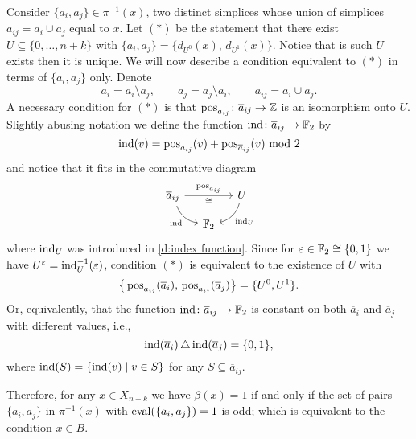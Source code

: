 Consider $\{a_i, a_j\} \in \pi^{-1}(x)$, two distinct simplices whose union of simplices $a_{ij} = a_i \cup a_j$ equal to $x$.
Let $(\ast)$ be the statement that there exist $U \subseteq \{0, \dots, n+k\}$ with $\{a_i, a_j\} = \{d_{U^0}(x),\, d_{U^1}(x)\}$.
Notice that is such $U$ exists then it is unique.
We will now describe a condition equivalent to $(\ast)$ in terms of $\{a_i, a_j\}$ only.
Denote
\begin{equation*}
\overline{a}_{i} = a_i \setminus a_j, \qquad
\overline{a}_{j} = a_j \setminus a_i, \qquad
\overline{a}_{ij} = \overline{a}_i \cup \overline{a}_j.
\end{equation*}
A necessary condition for $(\ast)$ is that $\operatorname{pos}_{a_{ij}} \colon \overline{a}_{ij} \to \mathbb{Z}$ is an isomorphism onto $U$.
Slightly abusing notation we define the function $\mathrm{ind} \colon \overline{a}_{ij} \to {\mathbb{F}_2}$ by
\begin{equation*}
\mathrm{ind}(v) = \operatorname{pos}_{a_{ij}}(v) + \operatorname{pos}_{\overline{a}_{ij}}(v) \text{ mod }2
\end{equation*}
and notice that it fits in the commutative diagram
\[
\begin{tikzcd}[column sep=small, row sep=small]
\overline{a}_{ij} \arrow[rr, "\pos_{a_{ij}}", "\cong"'] \arrow[dr, "\ind"', bend right] & &
U \arrow[dl, "\ind_U", bend left] \\
& \Ftwo &
\end{tikzcd}
\]
where $\mathrm{ind}_U$ was introduced in \cref{d:index function}.
Since for $\varepsilon \in {\mathbb{F}_2} \cong \{0,1\}$ we have $U^\varepsilon = \mathrm{ind}_U^{-1}(\varepsilon)$, condition $(\ast)$ is equivalent to the existence of $U$ with
\begin{equation} \label{e:pos's equal U's}
\big\{\operatorname{pos}_{a_{ij}}(\overline{a}_i),\, \operatorname{pos}_{a_{ij}}(\overline{a}_j)\big\} = \{U^0, U^1\}.
\end{equation}
Or, equivalently, that the function $\mathrm{ind} \colon \overline{a}_{ij} \to {\mathbb{F}_2}$ is constant on both $\overline{a}_i$ and $\overline{a}_j$ with different values, i.e.,
\begin{equation*}
\mathrm{ind}(\overline{a}_i) \operatorname{\triangle} \mathrm{ind}(\overline{a}_j) = \{0,1\},
\end{equation*}
where $\mathrm{ind}(S) = \{\mathrm{ind}(v) \mid v \in S\}$ for any $S \subseteq \overline{a}_{ij}$.

Therefore, for any $x \in X_{n+k}$ we have $\beta(x) = 1$ if and only if the set of pairs $\{a_i, a_j\}$ in $\pi^{-1}(x)$ with $\operatorname{eval}(\{a_i, a_j\}) = 1$ is odd; which is equivalent to the condition $x \in B$.

